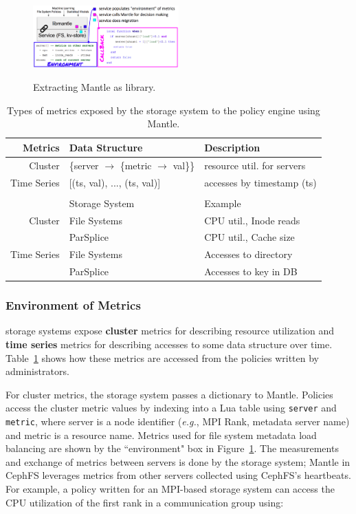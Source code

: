 \begin{figure}[t]
  \noindent\includegraphics[width=0.5\textwidth]{figures/mantle.png}\\

  \caption{Extracting Mantle as library.\label{fig:mantle}}

\end{figure}

\begin{table}
  \centering
  \begin{tabular}{ r | l | l }
  Metrics     & Data Structure & Description \\\hline
  Cluster     & \{server \(\rightarrow\) \{metric \(\rightarrow\) val\}\}
              & resource util. for servers \\
  Time Series & [(ts, val), ..., (ts, val)]
              & accesses by timestamp (ts) \\
  && \\
              & Storage System & Example \\\hline
  Cluster     & File Systems & CPU util., Inode reads \\
              & ParSplice    & CPU util., Cache size \\
  Time Series & File Systems & Accesses to directory \\
              & ParSplice    & Accesses to key in DB\\
  \end{tabular}
  \caption{Types of metrics exposed by the storage system to the policy engine using Mantle.\label{table:metrics}}
\end{table}

\subsubsection{Environment of Metrics} storage systems expose \textbf{cluster} metrics
for describing resource utilization and \textbf{time series} metrics for
describing accesses to some data structure over time. Table~\ref{table:metrics}
shows how these metrics are accessed from the policies written by
administrators. 

For cluster metrics, the storage system passes a dictionary to Mantle. Policies access
the cluster metric values by indexing into a Lua table using \texttt{server}
and \texttt{metric}, where server is a node identifier ({\it e.g.}, MPI Rank,
metadata server name) and metric is a resource name.  Metrics used for file
system metadata load balancing are shown by the ``environment" box in
Figure~\ref{fig:mantle}. The measurements and exchange of metrics between
servers is done by the storage system; Mantle in CephFS leverages metrics from other
servers collected using CephFS's heartbeats.  For example, a policy written for
an MPI-based storage system can access the CPU utilization of the first rank in a
communication group using:

